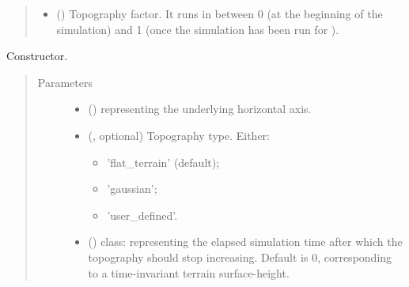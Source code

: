 \documentclass[letterpaper,10pt,english]{sphinxmanual}
\begin{document}
\begin{fulllineitems}
\begin{quote}
\begin{description}
\begin{itemize}
\item {} 
 () \textendash{} Topography factor. It runs in between 0 (at the beginning of the simulation) and 1 (once the simulation
has been run for ).

\end{itemize}

\end{description}\end{quote}

\begin{fulllineitems}
\label{\detokenize{api:grids.topography.Topography1d.__init__}}
Constructor.
\begin{quote}\begin{description}
\item[{Parameters}] \leavevmode\begin{itemize}
\item {} 
 () \textendash{} {\hyperref[\detokenize{api:grids.axis.Axis}]{}} representing the underlying horizontal axis.

\item {} 
 (, optional) \textendash{} 
Topography type. Either:
\begin{itemize}
\item {} 
’flat\_terrain’ (default);

\item {} 
’gaussian’;

\item {} 
’user\_defined’.

\end{itemize}


\item {} 
 () \textendash{} class: representing the elapsed simulation time after which the topography
should stop increasing. Default is 0, corresponding to a time-invariant terrain surface-height.

\end{itemize}


\end{description}
\end{quote}
\end{fulllineitems}
\end{fulllineitems}
\end{document}
